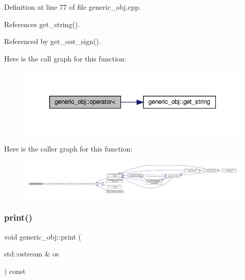 Definition at line 77 of file generic\+\_\+obj.\+cpp.



References get\+\_\+string().



Referenced by get\+\_\+out\+\_\+sign().

Here is the call graph for this function\+:
\nopagebreak
\begin{figure}[H]
\begin{center}
\leavevmode
\includegraphics[width=344pt]{d1/d64/classgeneric__obj_a45eb078e658219090365fa966fa1a759_cgraph}
\end{center}
\end{figure}
Here is the caller graph for this function\+:
\nopagebreak
\begin{figure}[H]
\begin{center}
\leavevmode
\includegraphics[width=350pt]{d1/d64/classgeneric__obj_a45eb078e658219090365fa966fa1a759_icgraph}
\end{center}
\end{figure}
\mbox{\label{classgeneric__obj_ad1dbe7ec4abc9bf55d093b0468899a9e}} 
\subsubsection{\texorpdfstring{print()}{print()}}
{\footnotesize\ttfamily void generic\+\_\+obj\+::print (\begin{DoxyParamCaption}\item[{std\+::ostream \&}]{os }\end{DoxyParamCaption}) const\hspace{0.3cm}{\ttfamily [inline]}}



